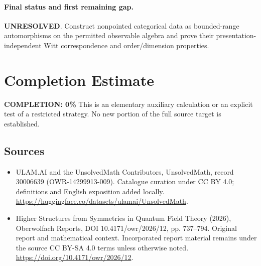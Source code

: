 \documentclass[11pt]{article}
\begin{document}
\paragraph{Final status and first remaining gap.}
\textbf{UNRESOLVED}. Construct nonpointed categorical data as bounded-range automorphisms on the permitted observable algebra and prove their presentation-independent Witt correspondence and order/dimension properties.

\section{Completion Estimate}
\noindent\textbf{COMPLETION: 0\%}
This is an elementary auxiliary calculation or an explicit test of a restricted strategy. No new portion of the full source target is established.

\subsection{Sources}
\begin{itemize}
\item[\hypertarget{source:30006639:1}{S1}] ULAM.AI and the UnsolvedMath Contributors, UnsolvedMath, record 30006639 (OWR-14299913-009). Catalogue curation under CC BY 4.0; definitions and English exposition added locally.
\url{https://huggingface.co/datasets/ulamai/UnsolvedMath}.
\item[\hypertarget{source:30006639:2}{S2}] Higher Structures from Symmetries in Quantum Field Theory (2026), Oberwolfach Reports, DOI 10.4171/owr/2026/12, pp. 737--794. Original report and mathematical context. Incorporated report material remains under the source CC BY-SA 4.0 terms unless otherwise noted.
\url{https://doi.org/10.4171/owr/2026/12}.
\end{itemize}
\label{end:30006639}
\end{document}
